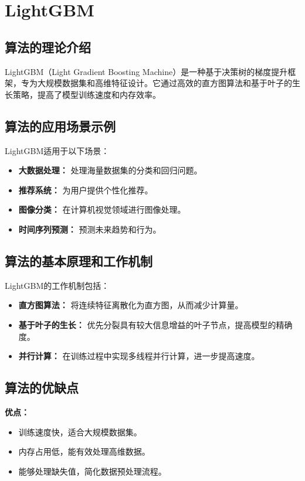 \section{LightGBM}
\subsection*{算法的理论介绍}
LightGBM（Light Gradient Boosting Machine）是一种基于决策树的梯度提升框架，专为大规模数据集和高维特征设计。它通过高效的直方图算法和基于叶子的生长策略，提高了模型训练速度和内存效率。

\subsection*{算法的应用场景示例}
LightGBM适用于以下场景：
\begin{itemize}
    \item \textbf{大数据处理：} 处理海量数据集的分类和回归问题。
    \item \textbf{推荐系统：} 为用户提供个性化推荐。
    \item \textbf{图像分类：} 在计算机视觉领域进行图像处理。
    \item \textbf{时间序列预测：} 预测未来趋势和行为。
\end{itemize}

\subsection*{算法的基本原理和工作机制}
LightGBM的工作机制包括：
\begin{itemize}
    \item \textbf{直方图算法：} 将连续特征离散化为直方图，从而减少计算量。
    \item \textbf{基于叶子的生长：} 优先分裂具有较大信息增益的叶子节点，提高模型的精确度。
    \item \textbf{并行计算：} 在训练过程中实现多线程并行计算，进一步提高速度。
\end{itemize}

\subsection*{算法的优缺点}
\textbf{优点：}
\begin{itemize}
    \item 训练速度快，适合大规模数据集。
    \item 内存占用低，能有效处理高维数据。
    \item 能够处理缺失值，简化数据预处理流程。
\end{itemize}


